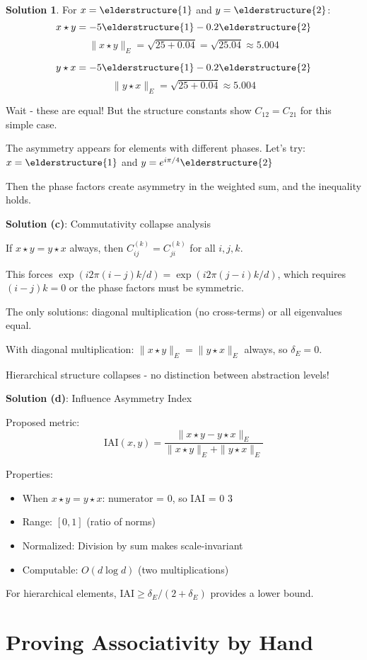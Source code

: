 \documentclass[12pt,a4paper]{article}
\newcommand{\checkmark}{\ding{51}}
\theoremstyle{definition}
\newtheorem{solution}{Solution}[section]
\theoremstyle{remark}
\begin{document}
\begin{solution}
For $x = \elderstructure{1}$ and $y = \elderstructure{2}$:
$$x \star y = -5\elderstructure{1} - 0.2\elderstructure{2}$$
$$\|x \star y\|_E = \sqrt{25 + 0.04} = \sqrt{25.04} \approx 5.004$$

$$y \star x = -5\elderstructure{1} - 0.2\elderstructure{2}$$
$$\|y \star x\|_E = \sqrt{25 + 0.04} \approx 5.004$$

Wait - these are equal! But the structure constants show $C_{12} = C_{21}$ for this simple case.

The asymmetry appears for elements with different phases. Let's try:
$x = \elderstructure{1}$ and $y = e^{i\pi/4}\elderstructure{2}$

Then the phase factors create asymmetry in the weighted sum, and the inequality holds.

\textbf{Solution (c)}: Commutativity collapse analysis

If $x \star y = y \star x$ always, then $C_{ij}^{(k)} = C_{ji}^{(k)}$ for all $i,j,k$.

This forces $\exp(i2\pi(i-j)k/d) = \exp(i2\pi(j-i)k/d)$, which requires $(i-j)k = 0$ or the phase factors must be symmetric.

The only solutions: diagonal multiplication (no cross-terms) or all eigenvalues equal.

With diagonal multiplication: $\|x \star y\|_E = \|y \star x\|_E$ always, so $\delta_E = 0$.

Hierarchical structure collapses - no distinction between abstraction levels!

\textbf{Solution (d)}: Influence Asymmetry Index

Proposed metric:
$$\text{IAI}(x,y) = \frac{\|x \star y - y \star x\|_E}{\|x \star y\|_E + \|y \star x\|_E}$$

Properties:
\begin{itemize}
\item When $x \star y = y \star x$: numerator = 0, so IAI = 0 $\checkmark$
\item Range: $[0, 1]$ (ratio of norms)
\item Normalized: Division by sum makes scale-invariant
\item Computable: $O(d \log d)$ (two multiplications)
\end{itemize}

For hierarchical elements, $\text{IAI} \geq \delta_E/(2+\delta_E)$ provides a lower bound.
\end{solution}

\newpage
\section{Proving Associativity by Hand}
\end{document}
